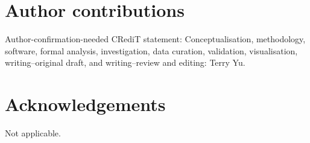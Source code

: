 \section*{Author contributions}
Author-confirmation-needed CRediT statement: Conceptualisation, methodology, software, formal analysis, investigation, data curation, validation, visualisation, writing--original draft, and writing--review and editing: Terry Yu.

\section*{Acknowledgements}
Not applicable.
